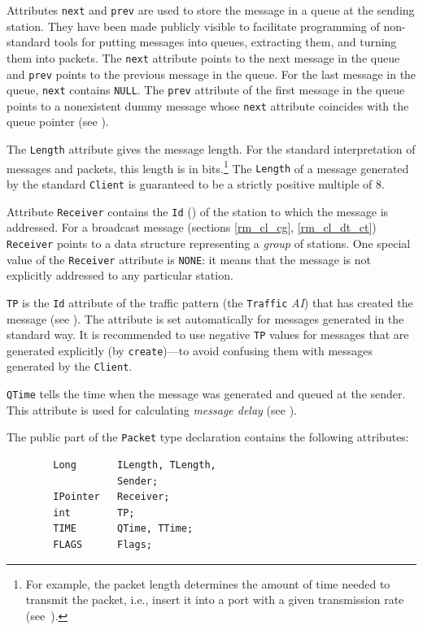 Attributes {\tt next} and {\tt prev} are used to store the message in a
queue at the sending station.
They have been made publicly visible to facilitate programming of non-standard
tools for putting messages into queues, extracting them, and turning them
into packets.
The {\tt next} attribute points to the next message in the queue and {\tt prev}
points to the previous message in the queue.
For the last message in the queue, {\tt next} contains {\tt NULL}.
The {\tt prev} attribute of the first message in the queue points to a
nonexistent
dummy message whose {\tt next} attribute coincides with the queue pointer
(see ).

The {\tt Length} attribute gives the message length.
For the standard interpretation of messages and packets, this length is in
bits.\footnote{For example, the packet length determines the amount of time
needed to transmit the packet, i.e., insert it into a port with a given
transmission rate (see~).}
The {\tt Length} of a message generated by the standard {\tt Client} is
guaranteed to be a strictly positive multiple of 8.

Attribute {\tt Receiver} contains the {\tt Id} ()
of the station to which the message is addressed.
For a broadcast message (sections \ref{rm_cl_cg}, \ref{rm_cl_dt_ct})
{\tt Receiver} points to a data
structure representing a {\em group\/} of stations.
One special value of the {\tt Receiver} attribute is {\tt NONE}: it means that
the message is not explicitly addressed to any particular station.

{\tt TP} is the {\tt Id} attribute of the traffic pattern (the {\tt Traffic}
{\em AI\/}) that has created the message (see ).
The attribute is set automatically for messages generated in the standard way.
It is recommended to use negative {\tt TP}
values for messages that are generated
explicitly (by {\tt create})---to avoid confusing them with messages
generated by the {\tt Client}.

{\tt QTime} tells the time when the message was generated and
queued at the sender.
This attribute is used for calculating {\em message delay\/}
(see ).

The public part of the {\tt Packet} type declaration contains the following
attributes:
\begin{verbatim}
        Long       ILength, TLength,
                   Sender;
        IPointer   Receiver;
        int        TP;
        TIME       QTime, TTime;
        FLAGS      Flags;
\end{verbatim}

